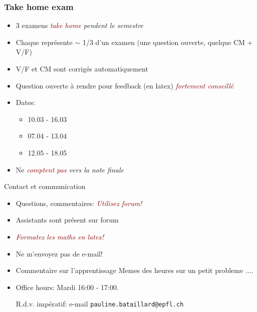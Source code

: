 \documentclass[t,aspectratio=149,mathserif]{beamer}
\newcommand{\myemph}[1]{\em \textcolor{darkred}{#1}}
\begin{document}
    \begin{frame}
     \frametitle{Take home exam} 
     \begin{itemize}
     \item 3 examens \myemph{take home} pendent le semestre
     \item Chaque représente $∼$ 1/3 d'un examen (une question ouverte, quelque CM + V/F)
     \item V/F et CM sont corrigés automatiquement
     \item Question ouverte à rendre pour feedback (en latex)  \myemph{fortement conseillé} 
     \item Dates:
       \begin{itemize}
       \item 10.03 - 16.03
       \item 07.04 - 13.04
       \item 12.05 - 18.05
       \end{itemize}
     \item Ne \myemph{comptent pas} vers la note finale 
     \end{itemize}
   \end{frame}

   \begin{frame}{Contact et communication}

     \begin{itemize}
     \item Questions, commentaires: \myemph{Utilisez forum!}
     \item Assistants sont présent sur forum 
     \item \myemph{Formatez les maths en latex!} 
     \item Ne m'envoyez pas de  e-mail!
       \item Commentaire sur l'apprentissage Memes des heures sur un petit probleme .... 
     \item Office hours: Mardi 16:00 - 17:00.

       
      R.d.v. impératif: e-mail  {\tt pauline.bataillard@epfl.ch  }
     \end{itemize}
     
   \end{frame}
 
\end{document}

